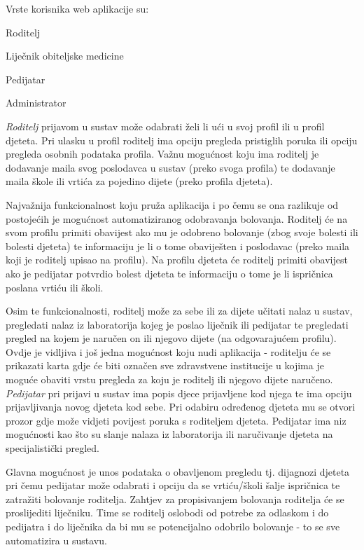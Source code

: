 		Vrste korisnika web aplikacije su:
		\begin{packed_item}
			\item Roditelj
			\item Liječnik obiteljske medicine
			\item Pedijatar
			\item Administrator
			
		\end{packed_item}
		
		
		\textit{Roditelj} prijavom u sustav može odabrati želi li ući u svoj profil ili u profil djeteta. Pri ulasku u profil roditelj ima opciju pregleda pristiglih poruka ili opciju pregleda osobnih podataka profila. Važnu mogućnost koju ima roditelj je dodavanje maila svog poslodavca u sustav (preko svoga profila) te dodavanje maila škole ili vrtića za pojedino dijete (preko profila djeteta). 
		
		Najvažnija funkcionalnost koju pruža aplikacija i po čemu se ona razlikuje od postojećih je mogućnost automatiziranog odobravanja bolovanja. Roditelj će na svom profilu primiti obavijest ako mu je odobreno bolovanje (zbog svoje bolesti ili bolesti djeteta) te informaciju je li o tome obaviješten i poslodavac (preko maila koji je roditelj upisao na profilu). Na profilu djeteta će roditelj primiti obavijest ako je pedijatar potvrdio bolest djeteta te informaciju o tome je li ispričnica poslana vrtiću ili školi.
		
		Osim te funkcionalnosti, roditelj može za sebe ili za dijete učitati nalaz u sustav, pregledati nalaz iz laboratorija kojeg je poslao liječnik ili pedijatar te pregledati pregled na kojem je naručen on ili njegovo dijete (na odgovarajućem profilu). Ovdje je vidljiva i još jedna mogućnost koju nudi aplikacija - roditelju će se prikazati karta gdje će biti označen sve zdravstvene institucije u kojima je moguće obaviti vrstu pregleda za koju je roditelj ili njegovo dijete naručeno.\\
		
		
		\textit{Pedijatar} pri prijavi u sustav ima popis djece prijavljene kod njega te ima opciju prijavljivanja novog djeteta kod sebe. Pri odabiru određenog djeteta mu se otvori prozor gdje može vidjeti povijest poruka s roditeljem djeteta. Pedijatar ima niz mogućnosti kao što su slanje nalaza iz laboratorija ili naručivanje djeteta na specijalistički pregled. 
		
		Glavna mogućnost je unos podataka o obavljenom pregledu tj. dijagnozi djeteta pri čemu pedijatar može odabrati i opciju da se vrtiću/školi šalje ispričnica te zatražiti bolovanje roditelja. Zahtjev za propisivanjem bolovanja roditelja će se proslijediti liječniku. Time se roditelj oslobodi od potrebe za odlaskom i do pedijatra i do liječnika da bi mu se potencijalno odobrilo bolovanje - to se sve automatizira u sustavu.\\
		
